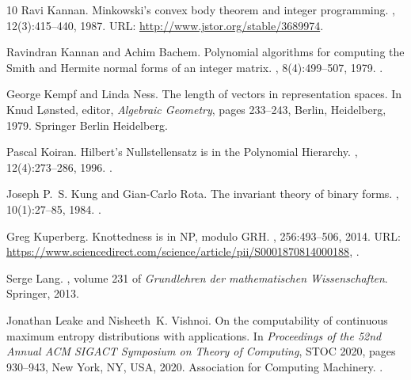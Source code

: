 \documentclass[10pt,a4paper]{article}
\theoremstyle{definition}
\numberwithin{equation}{section}
\begin{document}
\begin{thebibliography}{10}
Ravi Kannan.
\newblock Minkowski's convex body theorem and integer programming.
, 12(3):415--440, 1987.
\newblock URL: \url{http://www.jstor.org/stable/3689974}.

Ravindran Kannan and Achim Bachem.
\newblock Polynomial algorithms for computing the {S}mith and {H}ermite normal
  forms of an integer matrix.
, 8(4):499--507, 1979.
\newblock \href {https://doi.org/10.1137/0208040} {}.

George Kempf and Linda Ness.
\newblock The length of vectors in representation spaces.
\newblock In Knud L{\o}nsted, editor, {\em Algebraic Geometry}, pages 233--243,
  Berlin, Heidelberg, 1979. Springer Berlin Heidelberg.

Pascal Koiran.
\newblock Hilbert's {N}ullstellensatz is in the {P}olynomial {H}ierarchy.
, 12(4):273--286, 1996.
\newblock \href {https://doi.org/https://doi.org/10.1006/jcom.1996.0019}
  {}.

Joseph P.~S. Kung and Gian-Carlo Rota.
\newblock The invariant theory of binary forms.
, 10(1):27--85, 1984.
\newblock \href {https://doi.org/10.1090/S0273-0979-1984-15188-7}
  {}.

Greg Kuperberg.
\newblock Knottedness is in {NP}, modulo {GRH}.
, 256:493--506, 2014.
\newblock URL:
  \url{https://www.sciencedirect.com/science/article/pii/S0001870814000188},
  \href {https://doi.org/https://doi.org/10.1016/j.aim.2014.01.007}
  {}.

Serge Lang.
, volume 231 of {\em
  Grundlehren der mathematischen Wissenschaften}.
\newblock Springer, 2013.

Jonathan Leake and Nisheeth~K. Vishnoi.
\newblock On the computability of continuous maximum entropy distributions with
  applications.
\newblock In {\em Proceedings of the 52nd Annual ACM SIGACT Symposium on Theory
  of Computing}, STOC 2020, pages 930--943, New York, NY, USA, 2020.
  Association for Computing Machinery.
\newblock \href {https://doi.org/10.1145/3357713.3384302}
  {}.


\end{thebibliography}
\end{document}

